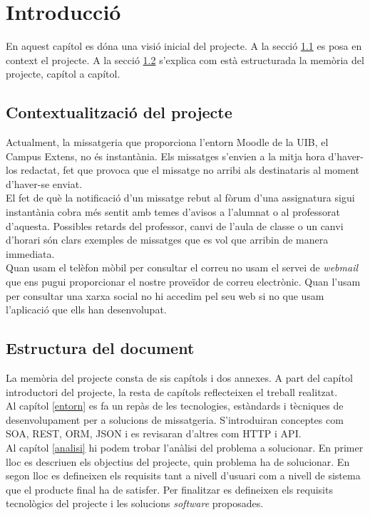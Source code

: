 \chapter{Introducció}
En aquest capítol es dóna una visió inicial del projecte. A la secció \ref{contexte} es posa en context el projecte. A la secció \ref{estructura_document} s'explica com està estructurada la memòria del projecte, capítol a capítol.

\section{Contextualització del projecte}\label{contexte}
Actualment, la missatgeria que proporciona l'entorn Moodle de la \ac{UIB}, el Campus Extens, no és instantània. Els missatges s'envien a la mitja hora d'haver-los redactat, fet que provoca que el missatge no arribi als destinataris al moment d'haver-se enviat. \\

El fet de què la notificació d'un missatge rebut al fòrum d'una assignatura sigui instantània cobra més sentit amb temes d'avisos a l'alumnat o al professorat d'aquesta. Possibles retards del professor, canvi de l'aula de classe o un canvi d'horari són clars exemples de missatges que es vol que arribin de manera immediata.\\

Quan usam el telèfon mòbil per consultar el correu no usam el servei de \emph{webmail} que ens pugui proporcionar el nostre proveïdor de correu electrònic. Quan l'usam per consultar una xarxa social no hi accedim pel seu web si no que usam l'aplicació que ells han desenvolupat. 

 
\section{Estructura del document}\label{estructura_document}
La memòria del projecte consta de sis capítols i dos annexes. A part del capítol introductori del projecte, la resta de capítols reflecteixen el treball realitzat.\\

Al capítol \ref{entorn} es fa un repàs de les tecnologies, estàndards i tècniques de desenvolupament per a solucions de missatgeria. S'introduiran conceptes com \ac{SOA}, \ac{REST}, \ac{ORM}, \ac{JSON} i es revisaran d'altres com \ac{HTTP} i \ac{API}.\\

Al capítol \ref{analisi} hi podem trobar l'anàlisi del problema a solucionar. En primer lloc es descriuen els objectius del projecte, quin problema ha de solucionar. En segon lloc es defineixen els requisits tant a nivell d'usuari com a nivell de sistema que el producte final ha de satisfer. Per finalitzar es defineixen els requisits tecnològics del projecte i les solucions \emph{software} proposades.\\

